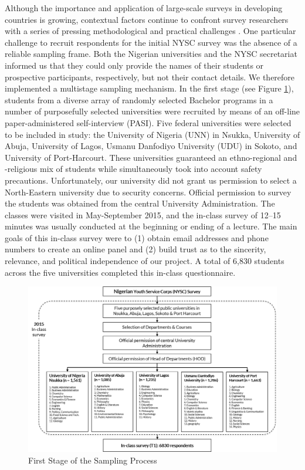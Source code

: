 Although the importance and application of large-scale surveys in developing countries is growing, contextual factors continue to confront survey researchers with a series of pressing methodological and practical challenges \citep{Bulmer1993, Bulmer1993b}. One particular challenge to recruit respondents for the initial NYSC survey was the absence of a reliable sampling frame. Both the Nigerian universities and the NYSC secretariat informed us that they could only provide the names of their students or prospective participants, respectively, but not their contact details. We therefore implemented a multistage sampling mechanism. In the first stage (see Figure \ref{fig:art2-app-fig1}), students from a diverse array of randomly selected Bachelor programs in a number of purposefully selected universities were recruited by means of an off-line paper-administered self-interview (PASI). Five federal universities were selected to be included in study: the University of Nigeria (UNN) in Nsukka, University of Abuja, University of Lagos, Usmanu Danfodiyo University (UDU) in Sokoto, and University of Port-Harcourt. These universities guaranteed an ethno-regional and -religious mix of students while simultaneously took into account safety precautions. Unfortunately, our university did not grant us permission to select a North-Eastern university due to security concerns. Official permission to survey the students was obtained from the central University Administration. The classes were visited in May-September 2015, and the in-class survey of 12–15 minutes was usually conducted at the beginning or ending of a lecture. The main goals of this in-class survey were to (1) obtain email addresses and phone numbers to create an online panel and (2) build trust as to the sincerity, relevance, and political independence of our project. A total of 6,830 students across the five universities completed this in-class questionnaire.

\vspace{1.5mm}
\begin{figure}[H]
\centering
\includegraphics[width=\textwidth]{Appendices/Appendix_chapter_3/art2-app-figure1.png}
\caption{First Stage of the Sampling Process}
\label{fig:art2-app-fig1}    
\end{figure}

